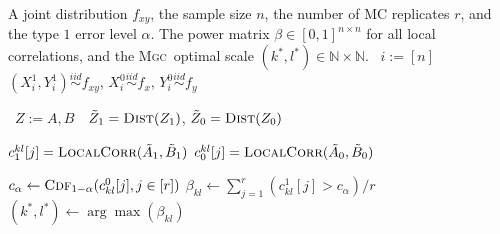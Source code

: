 \documentclass[11pt]{article}
\providecommand{\sct}[1]{{\normalfont\textsc{#1}}}
\newcommand{\G}{c}
\newcommand{\Linefor}[2]{%
    \State \algorithmicfor\ {#1}\ \algorithmicdo\ {#2} \algorithmicend\ \algorithmicfor%
}
\newcommand{\Mgc}{\sct{Mgc}}
\newcommand{\rto}{\leftarrow}
\begin{document}
\begin{algorithm}
\caption{Testing Powers Computation for All Local Correlations: this algorithm computes the testing powers of all local correlations. By repeatedly simulating samples by the joint distribution $f_{xy}$, sample data of size $n$ under the null and the alternative are generated for $r$ Monte-Carlo replicates. Then all sample local correlations under the null and the alternative hypotheses are computed by Algorithm~\ref{alg:all_scales}, followed by estimating the testing power at each local correlation. The \Mgc~optimal scale can be found by selecting the scale that maximizes power, and it suffices to pick one optimal scale in case of ties. In the simulation we use $r=2$,$000$ MC replicates to estimate the optimal scale, and another $r=10$,$000$ MC replicates to estimate the power. The running time is $O(rn^2 \log n)$. This algorithm can be similarly adapted to training data, for which the alternative statistic can be computed from the training data while the null statistic can be computed by permutation. }
\label{alg:power}
\begin{algorithmic}[1]
\Require A joint distribution $f_{xy}$, the sample size $n$, the number of MC replicates $r$, and the type $1$ error level $\alpha$.
\Ensure The power matrix $\beta \in [0,1]^{n \times n}$ for all local correlations, and the \Mgc~optimal scale $(k^{*},l^{*}) \in \mathbb{N} \times \mathbb{N}$.
\Linefor{$i:=[n]$}{$(X^{1}_{i},Y^{1}_{i}) \stackrel{iid}{\sim} f_{xy}$, $X^{0}_{i} \stackrel{iid}{\sim} f_{x}$, $Y^{0}_{i} \stackrel{iid}{\sim} f_{y}$} 
\Linefor{$Z:=A,B$}{$\tilde{Z}_{1}=\textsc{Dist}(Z_{1})$, $\tilde{Z}_{0}=\textsc{Dist}(Z_{0})$} 
\State $\G^{kl}_{1}[j]=\textsc{LocalCorr}(\tilde{A}_{1},\tilde{B}_{1})$ 
\State $\G^{kl}_{0}[j]=\textsc{LocalCorr}(\tilde{A}_{0},\tilde{B}_{0})$ 
\EndFor

\State $c_{\alpha} \rto \textsc{Cdf}_{1-\alpha}(\G^{0}_{kl}[j],j \in [r])$ 
\State $\beta_{kl} \rto \sum_{j=1}^{r}(\G^{1}_{kl}[j]>c_{\alpha}) / r$ 
\EndFor
\State $(k^{*},l^{*}) \rto \arg\max(\beta_{kl})$ 
\EndFunction
\end{algorithmic}
\end{algorithm}
\end{document}
